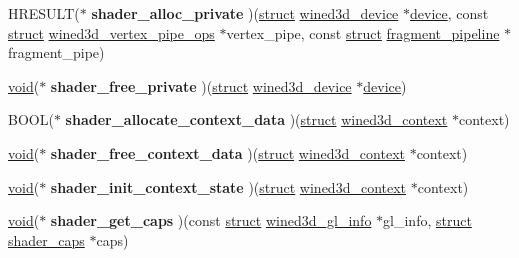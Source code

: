 \begin{DoxyCompactItemize}
H\+R\+E\+S\+U\+LT($\ast$ {\bfseries shader\+\_\+alloc\+\_\+private} )(\hyperlink{interfacestruct}{struct} \hyperlink{structwined3d__device}{wined3d\+\_\+device} $\ast$\hyperlink{structdevice}{device}, const \hyperlink{interfacestruct}{struct} \hyperlink{structwined3d__vertex__pipe__ops}{wined3d\+\_\+vertex\+\_\+pipe\+\_\+ops} $\ast$vertex\+\_\+pipe, const \hyperlink{interfacestruct}{struct} \hyperlink{structfragment__pipeline}{fragment\+\_\+pipeline} $\ast$fragment\+\_\+pipe)
\item 
\mbox{\label{structwined3d__shader__backend__ops_a50bbc8a30b8b5779c89bc91e277765b9}} 
\hyperlink{interfacevoid}{void}($\ast$ {\bfseries shader\+\_\+free\+\_\+private} )(\hyperlink{interfacestruct}{struct} \hyperlink{structwined3d__device}{wined3d\+\_\+device} $\ast$\hyperlink{structdevice}{device})
\item 
\mbox{\label{structwined3d__shader__backend__ops_a496b673218f24e0d8f9e7225a3b99f3c}} 
B\+O\+OL($\ast$ {\bfseries shader\+\_\+allocate\+\_\+context\+\_\+data} )(\hyperlink{interfacestruct}{struct} \hyperlink{structwined3d__context}{wined3d\+\_\+context} $\ast$context)
\item 
\mbox{\label{structwined3d__shader__backend__ops_ab9598540afa15ab29915abbbff631459}} 
\hyperlink{interfacevoid}{void}($\ast$ {\bfseries shader\+\_\+free\+\_\+context\+\_\+data} )(\hyperlink{interfacestruct}{struct} \hyperlink{structwined3d__context}{wined3d\+\_\+context} $\ast$context)
\item 
\mbox{\label{structwined3d__shader__backend__ops_a85b372f3dfe09acac42e9191771f4d9b}} 
\hyperlink{interfacevoid}{void}($\ast$ {\bfseries shader\+\_\+init\+\_\+context\+\_\+state} )(\hyperlink{interfacestruct}{struct} \hyperlink{structwined3d__context}{wined3d\+\_\+context} $\ast$context)
\item 
\mbox{\label{structwined3d__shader__backend__ops_ae3add6f19a7cdd904509477b605099a8}} 
\hyperlink{interfacevoid}{void}($\ast$ {\bfseries shader\+\_\+get\+\_\+caps} )(const \hyperlink{interfacestruct}{struct} \hyperlink{structwined3d__gl__info}{wined3d\+\_\+gl\+\_\+info} $\ast$gl\+\_\+info, \hyperlink{interfacestruct}{struct} \hyperlink{structshader__caps}{shader\+\_\+caps} $\ast$caps)

\end{DoxyCompactItemize}
